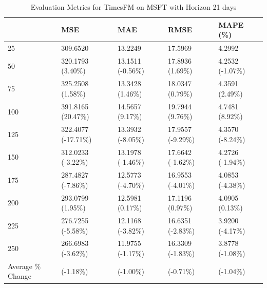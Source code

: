 \begin{table}
\caption{Evaluation Metrics for TimesFM on MSFT with Horizon 21 days}
\label{tab:fm_MSFT_h21_metrics}
\begin{tabular}{lllll}
\toprule
 & MSE & MAE & RMSE & MAPE (\%) \\
\midrule
25 & 309.6520 & 13.2249 & 17.5969 & 4.2992 \\
50 & 320.1793 (3.40\%) & 13.1511 (-0.56\%) & 17.8936 (1.69\%) & 4.2532 (-1.07\%) \\
75 & 325.2508 (1.58\%) & 13.3428 (1.46\%) & 18.0347 (0.79\%) & 4.3591 (2.49\%) \\
100 & 391.8165 (20.47\%) & 14.5657 (9.17\%) & 19.7944 (9.76\%) & 4.7481 (8.92\%) \\
125 & 322.4077 (-17.71\%) & 13.3932 (-8.05\%) & 17.9557 (-9.29\%) & 4.3570 (-8.24\%) \\
150 & 312.0233 (-3.22\%) & 13.1978 (-1.46\%) & 17.6642 (-1.62\%) & 4.2726 (-1.94\%) \\
175 & 287.4827 (-7.86\%) & 12.5773 (-4.70\%) & 16.9553 (-4.01\%) & 4.0853 (-4.38\%) \\
200 & 293.0799 (1.95\%) & 12.5981 (0.17\%) & 17.1196 (0.97\%) & 4.0905 (0.13\%) \\
225 & 276.7255 (-5.58\%) & 12.1168 (-3.82\%) & 16.6351 (-2.83\%) & 3.9200 (-4.17\%) \\
250 & 266.6983 (-3.62\%) & 11.9755 (-1.17\%) & 16.3309 (-1.83\%) & 3.8778 (-1.08\%) \\
Average \% Change & (-1.18\%) & (-1.00\%) & (-0.71\%) & (-1.04\%) \\
\bottomrule
\end{tabular}
\end{table}
